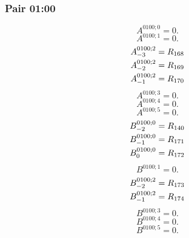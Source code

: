 \documentclass[11pt,a4paper]{article}
\begin{document}
\subsubsection{Pair 01:00}
\begin{equation}
A^{0100;0}=0.
\label{eq:cat-map-54}
\end{equation}
\begin{equation}
A^{0100;1}=0.
\label{eq:cat-map-55}
\end{equation}
\begin{equation}
\shortstack[l]{$\displaystyle A^{0100;2}_{-3}=R_{168}$\\
$\displaystyle A^{0100;2}_{-2}=R_{169}$\\
$\displaystyle A^{0100;2}_{-1}=R_{170}$}
\label{eq:cat-map-56}
\end{equation}
\begin{equation}
A^{0100;3}=0.
\label{eq:cat-map-57}
\end{equation}
\begin{equation}
A^{0100;4}=0.
\label{eq:cat-map-58}
\end{equation}
\begin{equation}
A^{0100;5}=0.
\label{eq:cat-map-59}
\end{equation}
\begin{equation}
\shortstack[l]{$\displaystyle B^{0100;0}_{-2}=R_{140}$\\
$\displaystyle B^{0100;0}_{-1}=R_{171}$\\
$\displaystyle B^{0100;0}_{0}=R_{172}$}
\label{eq:cat-map-60}
\end{equation}
\begin{equation}
B^{0100;1}=0.
\label{eq:cat-map-61}
\end{equation}
\begin{equation}
\shortstack[l]{$\displaystyle B^{0100;2}_{-2}=R_{173}$\\
$\displaystyle B^{0100;2}_{-1}=R_{174}$}
\label{eq:cat-map-62}
\end{equation}
\begin{equation}
B^{0100;3}=0.
\label{eq:cat-map-63}
\end{equation}
\begin{equation}
B^{0100;4}=0.
\label{eq:cat-map-64}
\end{equation}
\begin{equation}
B^{0100;5}=0.
\label{eq:cat-map-65}
\end{equation}
\end{document}

